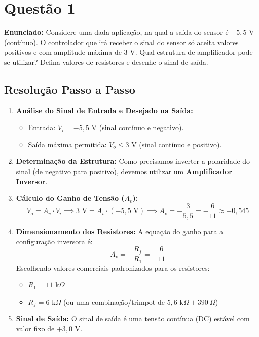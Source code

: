 \section*{Questão 1}
\textbf{Enunciado:} Considere uma dada aplicação, na qual a saída do sensor é $-5{,}5\text{ V}$ (contínuo). O controlador que irá receber o sinal do sensor só aceita valores positivos e com amplitude máxima de $3\text{ V}$. Qual estrutura de amplificador pode-se utilizar? Defina valores de resistores e desenhe o sinal de saída.

\subsection*{Resolução Passo a Passo}
\begin{enumerate}
    \item \textbf{Análise do Sinal de Entrada e Desejado na Saída:}
    \begin{itemize}
        \item Entrada: $V_i = -5{,}5\text{ V}$ (sinal contínuo e negativo).
        \item Saída máxima permitida: $V_o \le 3\text{ V}$ (sinal contínuo e positivo).
    \end{itemize}
    
    \item \textbf{Determinação da Estrutura:}
    Como precisamos inverter a polaridade do sinal (de negativo para positivo), devemos utilizar um \textbf{Amplificador Inversor}.

    \item \textbf{Cálculo do Ganho de Tensão ($A_v$):}
    \begin{equation*}
        V_o = A_v \cdot V_i \implies 3\text{ V} = A_v \cdot (-5{,}5\text{ V}) \implies A_v = -\frac{3}{5{,}5} = -\frac{6}{11} \approx -0{,}545
    \end{equation*}

    \item \textbf{Dimensionamento dos Resistores:}
    A equação do ganho para a configuração inversora é:
    \begin{equation*}
        A_v = -\frac{R_f}{R_1} = -\frac{6}{11}
    \end{equation*}
    Escolhendo valores comerciais padronizados para os resistores:
    \begin{itemize}
        \item $R_1 = 11\text{ k}\Omega$
        \item $R_f = 6\text{ k}\Omega$ (ou uma combinação/trimpot de $5{,}6\text{ k}\Omega + 390\ \Omega$)
    \end{itemize}

    \item \textbf{Sinal de Saída:}
    O sinal de saída é uma tensão contínua (DC) estável com valor fixo de $+3{,}0\text{ V}$.
\end{enumerate}




